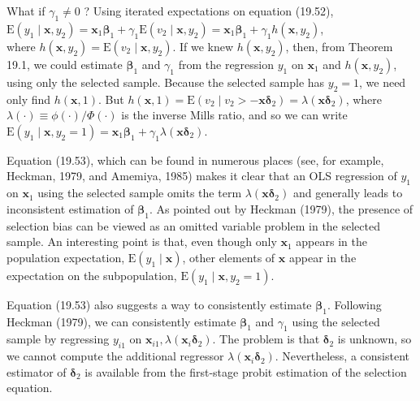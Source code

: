 \documentclass[10pt]{article}
\begin{document}
What if $\gamma_{1} \neq 0$ ? Using iterated expectations on equation (19.52),\\
$\mathrm{E}\left(y_{1} \mid \mathbf{x}, y_{2}\right)=\mathbf{x}_{1} \boldsymbol{\beta}_{1}+\gamma_{1} \mathrm{E}\left(v_{2} \mid \mathbf{x}, y_{2}\right)=\mathbf{x}_{1} \boldsymbol{\beta}_{1}+\gamma_{1} h\left(\mathbf{x}, y_{2}\right)$,\\
where $h\left(\mathbf{x}, y_{2}\right)=\mathrm{E}\left(v_{2} \mid \mathbf{x}, y_{2}\right)$. If we knew $h\left(\mathbf{x}, y_{2}\right)$, then, from Theorem 19.1, we could estimate $\boldsymbol{\beta}_{1}$ and $\gamma_{1}$ from the regression $y_{1}$ on $\mathbf{x}_{1}$ and $h\left(\mathbf{x}, y_{2}\right)$, using only the selected sample. Because the selected sample has $y_{2}=1$, we need only find $h(\mathbf{x}, 1)$. But $h(\mathbf{x}, 1)=\mathrm{E}\left(v_{2} \mid v_{2}>-\mathbf{x} \boldsymbol{\delta}_{2}\right)=\lambda\left(\mathbf{x} \boldsymbol{\delta}_{2}\right)$, where $\lambda(\cdot) \equiv \phi(\cdot) / \Phi(\cdot)$ is the inverse Mills ratio, and so we can write\\
$\mathrm{E}\left(y_{1} \mid \mathbf{x}, y_{2}=1\right)=\mathbf{x}_{1} \boldsymbol{\beta}_{1}+\gamma_{1} \lambda\left(\mathbf{x} \boldsymbol{\delta}_{2}\right)$.

Equation (19.53), which can be found in numerous places (see, for example, Heckman, 1979, and Amemiya, 1985) makes it clear that an OLS regression of $y_{1}$ on $\mathbf{x}_{1}$ using the selected sample omits the term $\lambda\left(\mathbf{x} \boldsymbol{\delta}_{2}\right)$ and generally leads to inconsistent estimation of $\boldsymbol{\beta}_{1}$. As pointed out by Heckman (1979), the presence of selection bias can be viewed as an omitted variable problem in the selected sample. An interesting point is that, even though only $\mathbf{x}_{1}$ appears in the population expectation, $\mathrm{E}\left(y_{1} \mid \mathbf{x}\right)$, other elements of $\mathbf{x}$ appear in the expectation on the subpopulation, $\mathrm{E}\left(y_{1} \mid \mathbf{x}, y_{2}=1\right)$.

Equation (19.53) also suggests a way to consistently estimate $\boldsymbol{\beta}_{1}$. Following Heckman (1979), we can consistently estimate $\boldsymbol{\beta}_{1}$ and $\gamma_{1}$ using the selected sample by regressing $y_{i 1}$ on $\mathbf{x}_{i 1}, \lambda\left(\mathbf{x}_{i} \boldsymbol{\delta}_{2}\right)$. The problem is that $\boldsymbol{\delta}_{2}$ is unknown, so we cannot compute the additional regressor $\lambda\left(\mathbf{x}_{i} \boldsymbol{\delta}_{2}\right)$. Nevertheless, a consistent estimator of $\boldsymbol{\delta}_{2}$ is available from the first-stage probit estimation of the selection equation.
\end{document}

